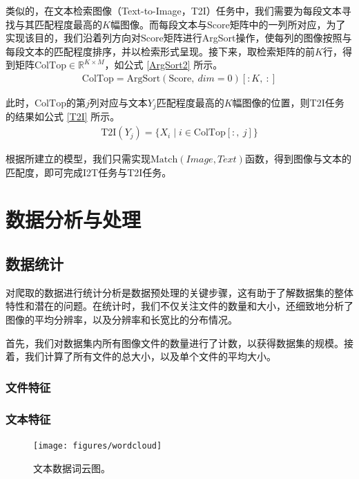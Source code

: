 \documentclass[a4paper]{zreport}
\begin{document}
类似的，在文本检索图像（Text-to-Image，T2I）任务中，我们需要为每段文本寻找与其匹配程度最高的$K$幅图像。而每段文本与$\mathrm{Score}$矩阵中的一列所对应，为了实现该目的，我们沿着列方向对$\mathrm{Score}$矩阵进行ArgSort操作，使每列的图像按照与每段文本的匹配程度排序，并以检索形式呈现。接下来，取检索矩阵的前$K$行，得到矩阵$\mathrm{ColTop} \in \mathbb{R}^{K \times M}$，如公式 \eqref{ArgSort2} 所示。
\begin{gather}
\mathrm{ColTop} = \mathrm{ArgSort}\left(\mathrm{Score},~dim=0\right)\left[:K,~:\right]
\label{ArgSort2}
\end{gather}

此时，$\mathrm{ColTop}$的第$j$列对应与文本$Y_j$匹配程度最高的$K$幅图像的位置，则T2I任务的结果如公式 \eqref{T2I} 所示。
\begin{gather}
\mathrm{T2I}\left(Y_j\right) = \{X_i\mid i \in \mathrm{ColTop}\left[:,~j\right]\}\label{T2I}
\end{gather}

根据所建立的模型，我们只需实现$\mathrm{Match}\left(Image, Text\right)$函数，得到图像与文本的匹配度，即可完成I2T任务与T2I任务。


\section{数据分析与处理}

\subsection{数据统计}

对爬取的数据进行统计分析是数据预处理的关键步骤，这有助于了解数据集的整体特性和潜在的问题。在统计时，我们不仅关注文件的数量和大小，还细致地分析了图像的平均分辨率，以及分辨率和长宽比的分布情况。

首先，我们对数据集内所有图像文件的数量进行了计数，以获得数据集的规模。接着，我们计算了所有文件的总大小，以及单个文件的平均大小。

\subsubsection{文件特征}

\subsubsection{文本特征}

\begin{figure}[h]
\centering
\texttt{[image: figures/wordcloud]}
\caption{文本数据词云图。}
\label{fig:wordcloud}
\end{figure}
\end{document}
